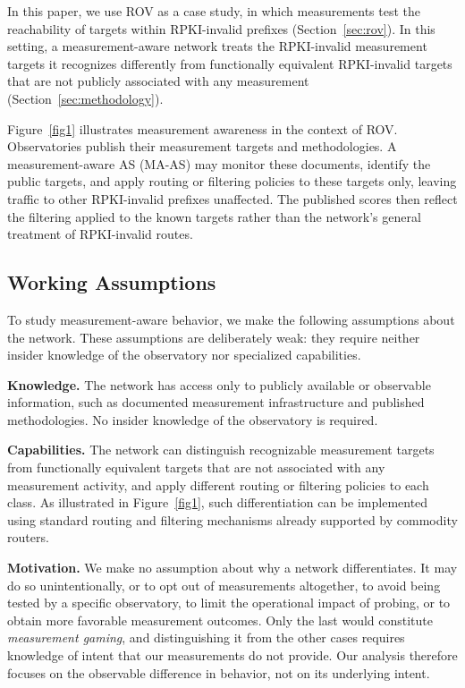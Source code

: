 \documentclass[sigconf, 10pt]{acmart}
\begin{document}
In this paper, we use ROV as a case study, in which measurements test the reachability of targets within RPKI-invalid prefixes (Section~\ref{sec:rov}). In this setting, a measurement-aware network treats the RPKI-invalid measurement targets it recognizes differently from functionally equivalent RPKI-invalid targets that are not publicly associated with any measurement (Section~\ref{sec:methodology}).

Figure~\ref{fig1} illustrates measurement awareness in the context of ROV. Observatories publish their measurement targets and methodologies. A measurement-aware AS (MA-AS) may monitor these documents, identify the public targets, and apply routing or filtering policies to these targets only, leaving traffic to other RPKI-invalid prefixes unaffected. The published scores then reflect the filtering applied to the known targets rather than the network's general treatment of RPKI-invalid routes.

\subsection{Working Assumptions}

To study measurement-aware behavior, we make the following assumptions about the network. These assumptions are deliberately weak: they require neither insider knowledge of the observatory nor specialized capabilities.

\textbf{Knowledge.}
The network has access only to publicly available or observable information, such as documented measurement infrastructure and published methodologies. No insider knowledge of the observatory is required.

\textbf{Capabilities.}
The network can distinguish recognizable measurement targets from functionally equivalent targets that are not associated with any measurement activity, and apply different routing or filtering policies to each class. As illustrated in Figure~\ref{fig1}, such differentiation can be implemented using standard routing and filtering mechanisms already supported by commodity routers.

\textbf{Motivation.}
We make no assumption about why a network differentiates. It may do so unintentionally, or to opt out of measurements altogether, to avoid being tested by a specific observatory, to limit the operational impact of probing, or to obtain more favorable measurement outcomes. Only the last would constitute \emph{measurement gaming}, and distinguishing it from the other cases requires knowledge of intent that our measurements do not provide. Our analysis therefore focuses on the observable difference in behavior, not on its underlying intent.
\end{document}
